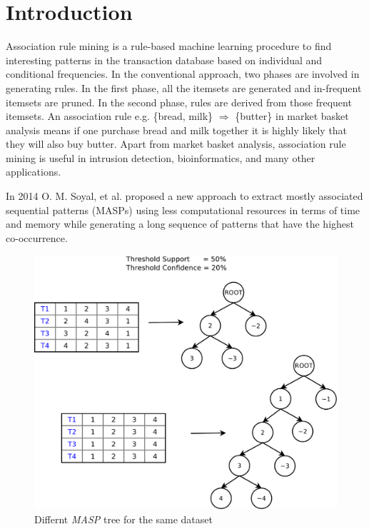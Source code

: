 \documentclass[preprint]{elsarticle}
\begin{document}
\section{Introduction}
Association rule mining is a rule-based machine learning procedure to find interesting patterns in the transaction database based on individual and conditional frequencies. In the conventional approach, two phases are involved in generating rules. In the first phase, all the itemsets are generated and in-frequent itemsets are pruned. In the second phase, rules are derived from those frequent itemsets. An association rule e.g. \{bread, milk\} $\Rightarrow$ \{butter\} in market basket analysis means if one purchase bread and milk together it is highly likely that they will also buy butter. Apart from market basket analysis, association rule mining is useful in intrusion detection, bioinformatics, and many other applications.

In 2014 O. M. Soyal, et al. \cite{oldmasp} proposed a new approach to extract mostly associated sequential patterns (MASPs) using less computational resources in terms of time and memory while generating a long sequence of patterns that have the highest co-occurrence.

\begin{figure}
\begin{center}
\includegraphics[scale=0.30]{pdf/firstimprove}
\end{center}
\caption{Differnt \emph{MASP} tree for the same dataset}
\label{Fig 12}
\end{figure}
\end{document}
